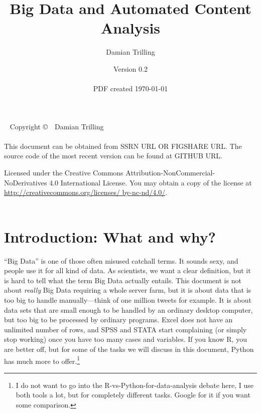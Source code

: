 \documentclass[a4paper,12pt]{book}
\title{Big Data and Automated Content Analysis}
\author{Damian Trilling}
\date{Version 0.2\\ ~ \\  \footnotesize{PDF created \today}}
\begin{document}
\frontmatter

\maketitle

\newpage

{~\vfill
\thispagestyle{empty}
\setlength{\parindent}{0pt}
\setlength{\parskip}{\baselineskip}
Copyright \copyright\ \the\year\ Damian Trilling\\
\vspace{.25cm} \\
This document can be obtained from SSRN URL OR FIGSHARE URL. The source code of the most recent version can be found at GITHUB URL.


\par Licensed under the Creative Commons Attribution-NonCommercial-NoDerivatives 4.0 International License. You may obtain a copy of the license at \url{http://creativecommons.org/licenses/ by-nc-nd/4.0/}. \\
\vspace{.5cm} \\
\ccbyncnd

}


\newpage

\tableofcontents


\chapter{Introduction: What and why?}

``Big Data'' is one of those often misused catchall terms. It sounds sexy, and people use it for all kind of data. As scientists, we want a clear definition, but it is hard to tell what the term Big Data actually entails. This document is not about \emph{really} Big Data requiring a whole server farm, but it is about data that is too big to handle manually---think of one million tweets for example. It is about data sets that are small enough to be handled by an ordinary desktop computer, but too big to be processed by ordinary programs. Excel does not have an unlimited number of rows, and SPSS and STATA start complaining (or simply stop working) once you have too many cases and variables. If you know R, you are better off, but for some of the tasks we will discuss in this document, Python has much more to offer.\footnote{I do not want to go into the R-vs-Python-for-data-analysis debate here, I use both tools a lot, but for completely different tasks. Google for it if you want some comparison.}  
\end{document}
